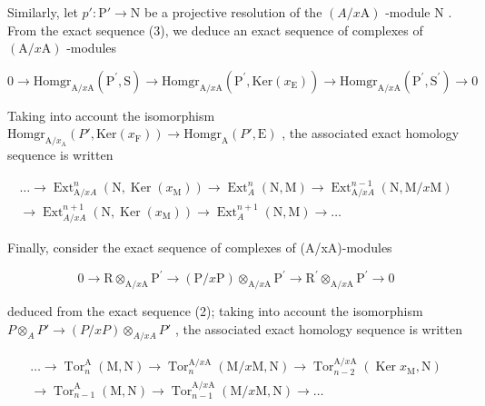 Similarly, let \(p' : \mathrm{P}' \to \mathrm{N}\) be a projective resolution of the \((A / x\mathrm{A})\) -module \(\mathrm{N}\) . From the exact sequence (3), we deduce an exact sequence of complexes of \((\mathrm{A} / x\mathrm{A})\) -modules

\[
0 \to \mathrm{Homgr} _ {\mathrm{A} / x \mathrm{A}} (\mathrm{P} ^ {\prime}, \mathrm{S}) \longrightarrow \mathrm{Homgr} _ {\mathrm{A} / x \mathrm{A}} (\mathrm{P} ^ {\prime}, \mathrm{Ker} (x _ {\mathrm{E}})) \longrightarrow \mathrm{Homgr} _ {\mathrm{A} / x \mathrm{A}} (\mathrm{P} ^ {\prime}, \mathrm{S} ^ {\prime}) \rightarrow 0
\]

Taking into account the isomorphism \(\mathrm{Homgr}_{\mathrm{A}/x_{\mathrm{A}}}(P',\mathrm{Ker}(x_{\mathrm{F}})) \longrightarrow \mathrm{Homgr}_{\mathrm{A}}(P',\mathrm{E})\) , the associated exact homology sequence is written

\[
\begin{array}{c} \dots \longrightarrow \operatorname{Ext} _ {\mathrm{A} / x A} ^ {n} (\mathrm{N}, \operatorname{Ker} (x _ {\mathrm{M}})) \longrightarrow \operatorname{Ext} _ {A} ^ {n} (\mathrm{N}, \mathrm{M}) \longrightarrow \operatorname{Ext} _ {\mathrm{A} / x A} ^ {n - 1} (\mathrm{N}, \mathrm{M} / x \mathrm{M}) \\ \longrightarrow \operatorname{Ext} _ {A / x A} ^ {n + 1} (\mathrm{N}, \operatorname{Ker} (x _ {\mathrm{M}})) \longrightarrow \operatorname{Ext} _ {A} ^ {n + 1} (\mathrm{N}, \mathrm{M}) \longrightarrow \dots \end{array}\tag{5}
\]

Finally, consider the exact sequence of complexes of (A/xA)-modules

\[
0 \rightarrow \mathrm{R} \otimes_ {\mathrm{A} / x \mathrm{A}} \mathrm{P} ^ {\prime} \longrightarrow (\mathrm{P} / x \mathrm{P}) \otimes_ {\mathrm{A} / x \mathrm{A}} \mathrm{P} ^ {\prime} \longrightarrow \mathrm{R} ^ {\prime} \otimes_ {\mathrm{A} / x \mathrm{A}} \mathrm{P} ^ {\prime} \rightarrow 0
\]

deduced from the exact sequence (2); taking into account the isomorphism \(P \otimes_{A} P' \longrightarrow (P/xP) \otimes_{A/xA} P'\) , the associated exact homology sequence is written

\[
\begin{array}{c} \ldots \longrightarrow \operatorname{Tor} _ {n} ^ {\mathrm{A}} (\mathrm{M}, \mathrm{N}) \longrightarrow \operatorname{Tor} _ {n} ^ {\mathrm{A} / x \mathrm{A}} (\mathrm{M} / x \mathrm{M}, \mathrm{N}) \longrightarrow \operatorname{Tor} _ {n - 2} ^ {\mathrm{A} / x \mathrm{A}} (\operatorname{Ker} x _ {\mathrm{M}}, \mathrm{N}) \\ \longrightarrow \operatorname{Tor} _ {n - 1} ^ {\mathrm{A}} (\mathrm{M}, \mathrm{N}) \longrightarrow \operatorname{Tor} _ {n - 1} ^ {\mathrm{A} / x \mathrm{A}} (\mathrm{M} / x \mathrm{M}, \mathrm{N}) \longrightarrow \ldots \end{array}\tag{6}
\]

